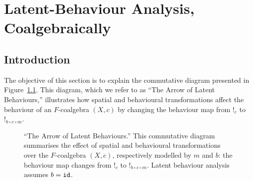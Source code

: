 

\chapter{Latent-Behaviour Analysis, Coalgebraically} %
\label{ch:LatentBehaviours} %

\section{Introduction}
The objective of this section is to explain the commutative diagram presented in Figure~\ref{fig:TheArrow}. This diagram, which we refer to as ``The Arrow of Latent Behaviours,'' illustrates how spatial and behavioural transformations affect the behaviour of an $F$-coalgebra $(X,c)$ by changing the behaviour map from $!_c$ to $!_{b\circ c\circ m}$. 

\begin{figure}[h]
        \centering
        \caption{``The Arrow of Latent Behaviours.'' This commutative diagram summarises the effect of spatial and behavioural transformations over the $F$-coalgebra $(X,c)$, respectively modelled by $m$ and $b$: the behaviour map changes from $!_c$ to $!_{b\circ c\circ m}$. Latent behaviour analysis assumes $b={\texttt{id}}$.}
        \label{fig:TheArrow} 
    \end{figure}

